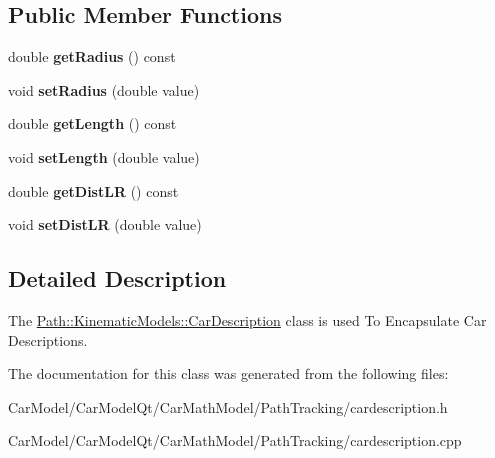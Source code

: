 \subsection*{Public Member Functions}
\begin{DoxyCompactItemize}
\item 
\mbox{\label{class_path_1_1_kinematic_models_1_1_car_description_a0a5d52772eecc8600982aa714bcd7a54}} 
double {\bfseries get\+Radius} () const
\item 
\mbox{\label{class_path_1_1_kinematic_models_1_1_car_description_af1610f36ec77c4c6afe36a7650f09af2}} 
void {\bfseries set\+Radius} (double value)
\item 
\mbox{\label{class_path_1_1_kinematic_models_1_1_car_description_a2fa8b576e5b09a039400f1ae55f01aa0}} 
double {\bfseries get\+Length} () const
\item 
\mbox{\label{class_path_1_1_kinematic_models_1_1_car_description_a61a94b23f65cb9b00c1520a951aee9a0}} 
void {\bfseries set\+Length} (double value)
\item 
\mbox{\label{class_path_1_1_kinematic_models_1_1_car_description_a9626410707fb0bf0b509503d6db6730f}} 
double {\bfseries get\+Dist\+LR} () const
\item 
\mbox{\label{class_path_1_1_kinematic_models_1_1_car_description_a1a492ddd36a0be207aa408c0ec55f04d}} 
void {\bfseries set\+Dist\+LR} (double value)
\end{DoxyCompactItemize}


\subsection{Detailed Description}
The \hyperlink{class_path_1_1_kinematic_models_1_1_car_description}{Path\+::\+Kinematic\+Models\+::\+Car\+Description} class is used To Encapsulate Car Descriptions. 

The documentation for this class was generated from the following files\+:\begin{DoxyCompactItemize}
\item 
Car\+Model/\+Car\+Model\+Qt/\+Car\+Math\+Model/\+Path\+Tracking/cardescription.\+h\item 
Car\+Model/\+Car\+Model\+Qt/\+Car\+Math\+Model/\+Path\+Tracking/cardescription.\+cpp\end{DoxyCompactItemize}
